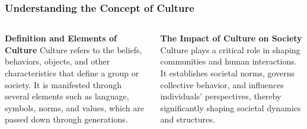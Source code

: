\documentclass[5pt]{beamer}
\begin{document}
\begin{frame}
\frametitle{Understanding the Concept of Culture}
\begin{columns}
\begin{column}{0.45\textwidth}
\begin{block}{\textbf{Definition and Elements of Culture}}
Culture refers to the beliefs, behaviors, objects, and other characteristics that define a group or society. It is manifested through several elements such as language, symbols, norms, and values, which are passed down through generations.
\end{block}
\end{column}
\begin{column}{0.45\textwidth}
\begin{block}{\textbf{The Impact of Culture on Society}}
Culture plays a critical role in shaping communities and human interactions. It establishes societal norms, governs collective behavior, and influences individuals' perspectives, thereby significantly shaping societal dynamics and structures.
\end{block}
\end{column}
\end{columns}
\end{frame}
\end{document}
